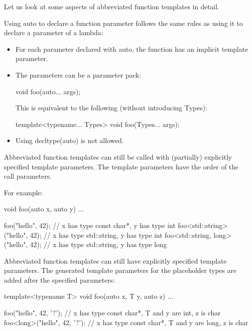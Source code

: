 
Let us look at some aspects of abbreviated function templates in detail.


Using auto to declare a function parameter follows the same rules as using it to declare a parameter of a lambda:

\begin{itemize}
\item
For each parameter declared with auto, the function has an implicit template parameter.

\item
The parameters can be a parameter pack:
\begin{cpp}
void foo(auto... args);
\end{cpp}

This is equivalent to the following (without introducing Types):
\begin{cpp}
template<typename... Types>
void foo(Types... args);
\end{cpp}

\item
Using decltype(auto) is not allowed.
\end{itemize}

Abbreviated function templates can still be called with (partially) explicitly specified template parameters. The template parameters have the order of the call parameters.

For example:

\begin{cpp}
void foo(auto x, auto y)
{
	...
}

foo("hello", 42); // x has type const char*, y has type int
foo<std::string>("hello", 42); // x has type std::string, y has type int
foo<std::string, long>("hello", 42); // x has type std::string, y has type long
\end{cpp}


Abbreviated function templates can still have explicitly specified template parameters. The generated template parameters for the placeholder types are added after the specified parameters:

\begin{cpp}
template<typename T>
void foo(auto x, T y, auto z)
{
	...
}

foo("hello", 42, '?'); // x has type const char*, T and y are int, z is char
foo<long>("hello", 42, '?'); // x has type const char*, T and y are long, z is char
\end{cpp}

